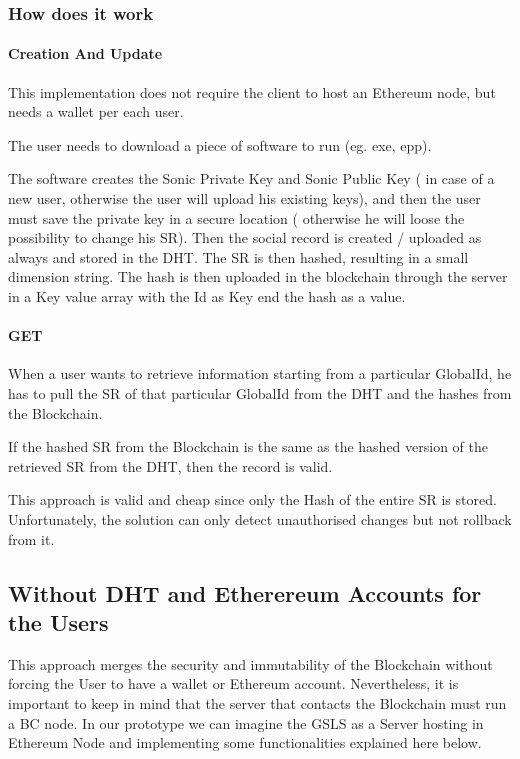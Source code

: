 \subsubsection{How does it work}
\paragraph{Creation And Update}

This implementation does not require the client to host an Ethereum node, but needs a wallet per each user.

The user needs to download a piece of software to run (eg. exe, epp).

The software creates the Sonic Private Key and Sonic Public Key ( in case of a new user, otherwise the user will upload his existing keys), and then the user must save the private key in a secure location ( otherwise he will loose the possibility to change his SR).
Then the social record is created / uploaded as always and stored in the DHT.
The SR is then hashed, resulting in a small dimension string.
The hash is then uploaded in the blockchain through the server in a Key value array with the Id as Key end the hash as a value.

\paragraph{GET}

When a user wants to retrieve information starting from a particular GlobalId, he has to pull the SR of that particular GlobalId from the DHT and the hashes from the Blockchain.

If the hashed SR from the Blockchain is the same as the hashed version of the retrieved SR from the DHT, then the record is valid.

This approach is valid and cheap since only the Hash of the entire SR is stored.
Unfortunately, the solution can only detect unauthorised changes but not rollback from it.

\subsection{Without DHT and Etherereum Accounts for the Users}
This approach merges the security and immutability of the Blockchain without forcing the User to have a wallet or Ethereum account. Nevertheless, it is important to keep in mind that the server that contacts the Blockchain must run a BC node. In our prototype we can imagine the GSLS as a Server hosting in Ethereum Node and implementing some functionalities explained here below.

